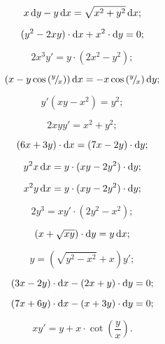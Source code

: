 \begin{multicols}{2}
	\begin{problem}
		\[ x \mathop{}\!\mathrm{d} y - y \mathop{}\!\mathrm{d} x = \sqrt{x^2 + y^2} \mathop{}\!\mathrm{d} x; \]
	\end{problem}
	
	\begin{problem}
		\[ (y^2 - 2xy) \cdot \mathop{}\!\mathrm{d} x + x^2 \cdot \mathop{}\!\mathrm{d} y = 0; \]
	\end{problem}
	
	\begin{problem}
		\[ 2x^3 y' = y \cdot (2x^2 - y^2); \]
	\end{problem}
	
	\begin{problem}
		\[ \left( x - y \cos \left({}^{y}\!/_{\!x}\right)\right) \mathop{}\!\mathrm{d} x = - x \cos \left({}^{y}\!/_{\!x}\right) \mathop{}\!\mathrm{d} y; \]
	\end{problem}
	
	\begin{problem}
		\[ y' (xy - x^2) = y^2; \]
	\end{problem}
	
	\begin{problem}
		\[ 2xyy' = x^2 + y^2; \]
	\end{problem}
	
	\begin{problem}
		\[ (6x + 3y) \cdot \mathop{}\!\mathrm{d} x = (7x - 2y) \cdot \mathop{}\!\mathrm{d} y; \]
	\end{problem}
	
	\begin{problem}
		\[ y^2 x \mathop{}\!\mathrm{d} x = y \cdot (xy - 2y^2) \cdot \mathop{}\!\mathrm{d} y; \]
	\end{problem}
	
	\begin{problem}
		\[ x^2 y \mathop{}\!\mathrm{d} x = y \cdot (xy - 2y^2) \cdot \mathop{}\!\mathrm{d} y; \]
	\end{problem}
	
	\begin{problem}
		\[ 2y^3 = xy' \cdot (2y^2 - x^2); \]
	\end{problem}
	
	\begin{problem}
		\[ \left( x + \sqrt{xy}\right) \cdot \mathop{}\!\mathrm{d} y = y \mathop{}\!\mathrm{d} x; \]
	\end{problem}
	
	\begin{problem}
		\[ y = \left( \sqrt{y^2 - x^2} + x\right) y'; \]
	\end{problem}
	
	\begin{problem}
		\[ (3x - 2y) \cdot \mathop{}\!\mathrm{d} x - (2x + y) \cdot \mathop{}\!\mathrm{d} y = 0; \]
	\end{problem}
	
	\begin{problem}
		\[ (7x + 6y) \cdot \mathop{}\!\mathrm{d} x - (x + 3y) \cdot \mathop{}\!\mathrm{d} y = 0; \]
	\end{problem}
	
	\begin{problem}
		\[ xy' = y + x \cdot \cot \left(\frac{y}{x}\right). \]
	\end{problem}
\end{multicols}


